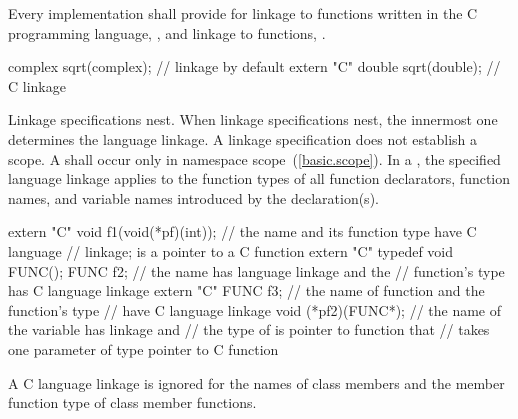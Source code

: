 \pnum
{}%
Every implementation shall provide for linkage to functions written in
the C programming language,
%
, and linkage to \Cpp functions, .
\enterexample

\begin{codeblock}
complex sqrt(complex);		// \Cpp linkage by default
extern "C" {
    double sqrt(double);        // C linkage
}
\end{codeblock}
\exitexampleb

\pnum
{}%
Linkage specifications nest. When linkage specifications nest, the
innermost one determines the language linkage. A linkage specification
does not establish a scope. A  shall
occur only in namespace scope~(\ref{basic.scope}). In a
, the specified language linkage applies
to the function types of all function declarators, function names, and
variable names introduced by the declaration(s).
\enterexample

\begin{codeblock}
extern "C" void f1(void(*pf)(int));
                                // the name  and its function type have C language
                                // linkage;  is a pointer to a C function
extern "C" typedef void FUNC();
FUNC f2;                        // the name  has \Cpp language linkage and the
                                // function's type has C language linkage
extern "C" FUNC f3;             // the name of function  and the function's type
                                // have C language linkage
void (*pf2)(FUNC*);             // the name of the variable  has \Cpp linkage and
                                // the type of  is pointer to \Cpp function that
                                // takes one parameter of type pointer to C function
\end{codeblock}
\exitexampleb
{}%
A C language linkage is ignored for the names of class members and the
member function type of class member functions.
\enterexample

